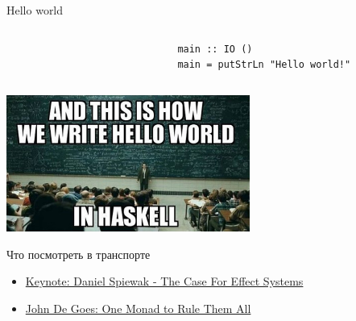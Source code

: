     \begin{frame}[fragile]{Hello world}
        \pause
        \vspace{-1em}
        \begin{columns}[onlytextwidth]
            \begin{column}[t]{0.3\textwidth}
            \end{column}\hfill%
            \begin{column}[t]{0.7\textwidth}
                \begin{verbatim}
                main :: IO ()
                main = putStrLn "Hello world!"
                \end{verbatim}
            \end{column}
        \end{columns}
        \pause
        \begin{center}
            \includegraphics[width=0.6\textwidth]{figs/hello_world}
        \end{center}
    \end{frame}


    \begin{frame}[fragile]{Что посмотреть в транспорте}
        \begin{itemize}
            \item \href{https://youtu.be/qgfCmQ-2tW0?si=9OBcKAlmGovWzSLp}{\color{blue} Keynote: Daniel Spiewak - The Case For Effect Systems}
            \item \href{https://youtu.be/M0Fe2SRTm5c?si=34lMmVWtRjPg9OYj}{\color{blue} John De Goes: One Monad to Rule Them All }
        \end{itemize}
    \end{frame}

